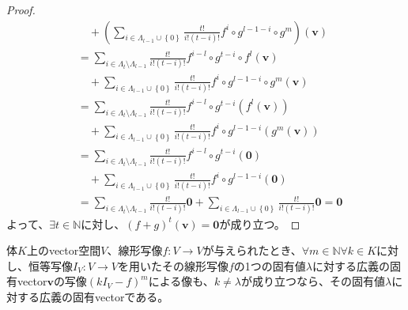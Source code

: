 \documentclass[dvipdfmx]{jsarticle}
\begin{document}
\begin{proof}
\begin{align*}
&\quad + \left( \sum_{i \in \varLambda_{l - 1} \cup \left\{ 0 \right\}} {\frac{t!}{i!(t - i)!}f^{i} \circ g^{l - 1 - i} \circ g^{m}} \right)\left( \mathbf{v} \right)\\
&= \sum_{i \in \varLambda_{t} \setminus \varLambda_{l - 1}} {\frac{t!}{i!(t - i)!}f^{i - l} \circ g^{t - i} \circ f^{l}\left( \mathbf{v} \right)} \\
&\quad + \sum_{i \in \varLambda_{l - 1} \cup \left\{ 0 \right\}} {\frac{t!}{i!(t - i)!}f^{i} \circ g^{l - 1 - i} \circ g^{m}\left( \mathbf{v} \right)}\\
&= \sum_{i \in \varLambda_{t} \setminus \varLambda_{l - 1}} {\frac{t!}{i!(t - i)!}f^{i - l} \circ g^{t - i}\left( f^{l}\left( \mathbf{v} \right) \right)} \\
&\quad + \sum_{i \in \varLambda_{l - 1} \cup \left\{ 0 \right\}} {\frac{t!}{i!(t - i)!}f^{i} \circ g^{l - 1 - i}\left( g^{m}\left( \mathbf{v} \right) \right)}\\
&= \sum_{i \in \varLambda_{t} \setminus \varLambda_{l - 1}} {\frac{t!}{i!(t - i)!}f^{i - l} \circ g^{t - i}\left( \mathbf{0} \right)} \\
&\quad + \sum_{i \in \varLambda_{l - 1} \cup \left\{ 0 \right\}} {\frac{t!}{i!(t - i)!}f^{i} \circ g^{l - 1 - i}\left( \mathbf{0} \right)}\\
&= \sum_{i \in \varLambda_{t} \setminus \varLambda_{l - 1}} {\frac{t!}{i!(t - i)!}\mathbf{0}} + \sum_{i \in \varLambda_{l - 1} \cup \left\{ 0 \right\}} {\frac{t!}{i!(t - i)!}\mathbf{0}} = \mathbf{0}
\end{align*}
よって、$\exists t \in \mathbb{N}$に対し、$(f + g)^{t}\left( \mathbf{v} \right) = \mathbf{0}$が成り立つ。
\end{proof}
\begin{thm}
\label{2.2.4.3}
体$K$上のvector空間$V$、線形写像$f:V \rightarrow V$が与えられたとき、$\forall m \in \mathbb{N}\forall k \in K$に対し、恒等写像$I_{V}:V \rightarrow V$を用いたその線形写像$f$の1つの固有値$\lambda$に対する広義の固有vector$\mathbf{v}$の写像$\left( kI_{V} - f \right)^{m}$による像も、$k \neq \lambda$が成り立つなら、その固有値$\lambda$に対する広義の固有vectorである。
\end{thm}
\end{document}
